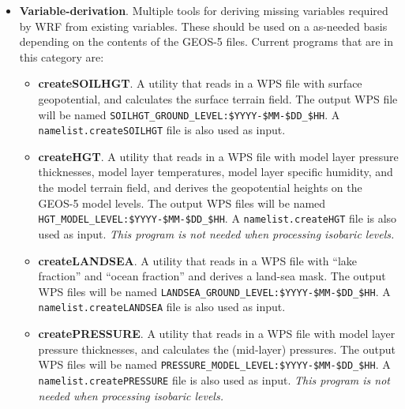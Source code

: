 \begin{itemize}
\begin{itemize}
\item \textbf{temporalInterpolation}. This program takes WPS
intermediate file format data and linearly interpolate in time. This can
be used, for example, to interpolate 6-hourly MERRA-2 analyses at 00Z, 06Z,
12Z, and 18Z to 3-hourly intervals for initializing WRF at 03Z, 09Z, 15Z,
or 21Z. Only a single, user-specified variable will be processed during a
particular program invocation, and other variables in the input data files
will be ignored. A \texttt{namelist.temporalInterpolation} file is used to
specify the variable, input and output data files.
\end{itemize}

\item \textbf{Variable-derivation}. Multiple tools for deriving missing 
variables required by WRF from existing variables. These should be used on a
as-needed basis depending on the contents of the GEOS-5 files. Current 
programs that are in this category are: 
\begin{itemize}

\item \textbf{createSOILHGT}.  A utility that reads in a WPS file with surface 
  geopotential, and calculates the surface terrain field.  The output WPS file
  will be named \texttt{SOILHGT\_GROUND\_LEVEL:\$YYYY-\$MM-\$DD\_\$HH}.  A 
  \texttt{namelist.createSOILHGT} file is also used as input.

\item \textbf{createHGT}. A utility that reads in a WPS file with model layer 
  pressure thicknesses, model layer temperatures, model layer specific 
  humidity, and the model terrain field, and derives the geopotential heights 
  on the GEOS-5 model levels.  The output WPS files will be named 
  \texttt{HGT\_MODEL\_LEVEL:\$YYYY-\$MM-\$DD\_\$HH}.  A 
  \texttt{namelist.createHGT} file is also used as input.  
  \emph{This program is not needed when processing isobaric levels.}
  
\item \textbf{createLANDSEA}. A utility that reads in a WPS file with 
  ``lake fraction'' and ``ocean fraction'' and derives a land-sea mask.  The 
  output WPS files will be named 
  \texttt{LANDSEA\_GROUND\_LEVEL:\$YYYY-\$MM-\$DD\_\$HH}.  A 
  \texttt{namelist.createLANDSEA} file is also used as input.

\item \textbf{createPRESSURE}. A utility that reads in a WPS file with model 
  layer pressure thicknesses, and calculates the (mid-layer) pressures.  The 
  output WPS files will be named 
  \texttt{PRESSURE\_MODEL\_LEVEL:\$YYYY-\$MM-\$DD\_\$HH}.  A 
  \texttt{namelist.createPRESSURE} file is also used as input.  
  \emph{This program is not needed when processing isobaric levels.}


\end{itemize}
\end{itemize}
